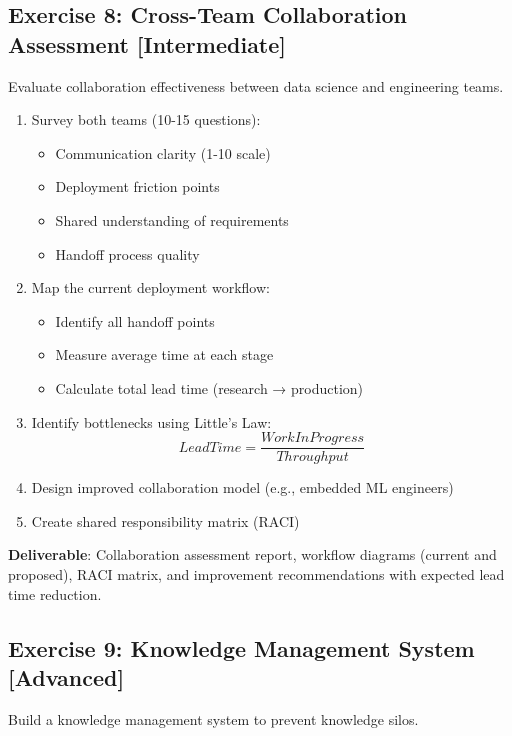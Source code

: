 \subsection{Exercise 8: Cross-Team Collaboration Assessment [Intermediate]}

Evaluate collaboration effectiveness between data science and engineering teams.

\begin{enumerate}
    \item Survey both teams (10-15 questions):
        \begin{itemize}
            \item Communication clarity (1-10 scale)
            \item Deployment friction points
            \item Shared understanding of requirements
            \item Handoff process quality
        \end{itemize}
    \item Map the current deployment workflow:
        \begin{itemize}
            \item Identify all handoff points
            \item Measure average time at each stage
            \item Calculate total lead time (research → production)
        \end{itemize}
    \item Identify bottlenecks using Little's Law:
        \begin{equation*}
        LeadTime = \frac{WorkInProgress}{Throughput}
        \end{equation*}
    \item Design improved collaboration model (e.g., embedded ML engineers)
    \item Create shared responsibility matrix (RACI)
\end{enumerate}

\textbf{Deliverable}: Collaboration assessment report, workflow diagrams (current and proposed), RACI matrix, and improvement recommendations with expected lead time reduction.

\subsection{Exercise 9: Knowledge Management System [Advanced]}

Build a knowledge management system to prevent knowledge silos.

